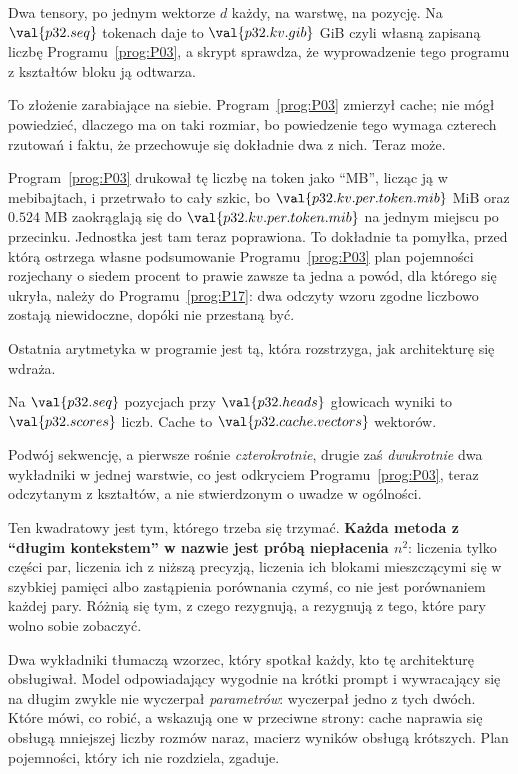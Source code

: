 \begin{fr}

Dwa tensory, po jednym wektorze $d$ każdy, na warstwę, na pozycję. Na
$\val{p32.seq}$ tokenach daje to $\val{p32.kv.gib}$ GiB \dash{} czyli własną
zapisaną liczbę Programu~\ref{prog:P03}, a skrypt sprawdza, że wyprowadzenie
tego programu z kształtów bloku ją odtwarza.

To złożenie zarabiające na siebie. Program~\ref{prog:P03} zmierzył cache; nie
mógł powiedzieć, dlaczego ma on taki rozmiar, bo powiedzenie tego wymaga
czterech rzutowań i faktu, że przechowuje się dokładnie dwa z nich. Teraz
może.

\begin{note}
Program~\ref{prog:P03} drukował tę liczbę na token jako \enquote{MB}, licząc
ją w mebibajtach, i przetrwało to cały szkic, bo
$\val{p32.kv.per.token.mib}$ MiB oraz $\num{0.524}$ MB zaokrąglają się do
$\val{p32.kv.per.token.mib}$ na jednym miejscu po przecinku. Jednostka jest
tam teraz poprawiona. To dokładnie ta pomyłka, przed którą ostrzega własne
podsumowanie Programu~\ref{prog:P03} \dash{} plan pojemności rozjechany o
siedem procent to prawie zawsze ta jedna \dash{} a powód, dla którego się
ukryła, należy do Programu~\ref{prog:P17}: dwa odczyty wzoru zgodne liczbowo
zostają niewidoczne, dopóki nie przestaną być.
\end{note}
\end{fr}

\begin{fr}
Ostatnia arytmetyka w programie jest tą, która rozstrzyga, jak architekturę się
wdraża.

Na $\val{p32.seq}$ pozycjach przy $\val{p32.heads}$ głowicach wyniki to
$\val{p32.scores}$ liczb. Cache to $\val{p32.cache.vectors}$ wektorów.

Podwój sekwencję, a pierwsze rośnie \emph{czterokrotnie}, drugie zaś
\emph{dwukrotnie} \dash{} dwa wykładniki w jednej warstwie, co jest odkryciem
Programu~\ref{prog:P03}, teraz odczytanym z kształtów, a nie stwierdzonym o
uwadze w ogólności.

Ten kwadratowy jest tym, którego trzeba się trzymać. \textbf{Każda metoda z
\enquote{długim kontekstem} w nazwie jest próbą niepłacenia $n^{2}$}:
liczenia tylko części par, liczenia ich z niższą precyzją, liczenia ich
blokami mieszczącymi się w szybkiej pamięci albo zastąpienia porównania
czymś, co nie jest porównaniem każdej pary. Różnią się tym, z czego rezygnują,
a rezygnują z tego, które pary wolno sobie zobaczyć.

\begin{aibox}
Dwa wykładniki tłumaczą wzorzec, który spotkał każdy, kto tę architekturę
obsługiwał. Model odpowiadający wygodnie na krótki prompt i wywracający się na
długim zwykle nie wyczerpał \emph{parametrów}: wyczerpał jedno z tych dwóch.
Które \dash{} mówi, co robić, a wskazują one w przeciwne strony: cache naprawia
się obsługą mniejszej liczby rozmów naraz, macierz wyników \dash{} obsługą
krótszych. Plan pojemności, który ich nie rozdziela, zgaduje.
\end{aibox}
\end{fr}

